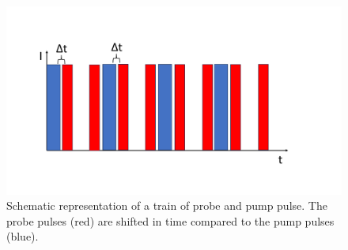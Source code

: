 \begin{figure}[h]
    \centering
    \includegraphics[width = 13cm]{Bilder/Grundlagen/PulseTrain.pdf}    
    \caption{Schematic representation of a train of probe and pump pulse. The probe pulses (red) are shifted in time compared to the pump pulses (blue).}
    \label{fig:PulseTrain}
\end{figure}

